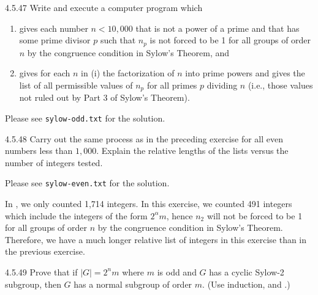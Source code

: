 \begin{exercise}{4.5.47}
	Write and execute a computer program which
	\begin{enumerate}
		\item[(i)] gives each number $n < 10,000$ that is not a power of a prime and that has some prime divisor $p$ such that $n_p$ is not forced to be 1 for all groups of order $n$ by the congruence condition in Sylow's Theorem, and
		\item[(ii)] gives for each $n$ in (i) the factorization of $n$ into prime powers and gives the list of all permissible values of $n_p$ for all primes $p$ dividing $n$ (i.e., those values not ruled out by Part 3 of Sylow's Theorem).
	\end{enumerate}
\end{exercise}

\begin{sol}
	Please see \verb|sylow-odd.txt| for the solution.
\end{sol}

\begin{exercise}{4.5.48}
	Carry out the same process as in the preceding exercise for all even numbers less than $1,000$.
	Explain the relative lengths of the lists versus the number of integers tested.
\end{exercise}

\begin{sol}
	Please see \verb|sylow-even.txt| for the solution.

	In , we only counted 1,714 integers.
	In this exercise, we counted 491 integers which include the integers of the form $2^\alpha m$, hence $n_2$ will not be forced to be 1 for all groups of order $n$ by the congruence condition in Sylow's Theorem.
	Therefore, we have a much longer relative list of integers in this exercise than in the previous exercise.
\end{sol}

\begin{exercise}{4.5.49}
	Prove that if $|G| = 2^nm$ where $m$ is odd and $G$ has a cyclic Sylow-2 subgroup, then $G$ has a normal subgroup of order $m$. (Use induction,  and .)
\end{exercise}

